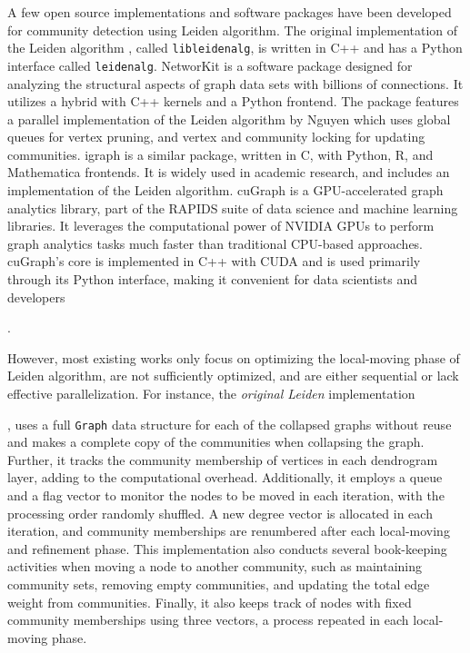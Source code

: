 A few open source implementations and software packages have been developed for community detection using Leiden algorithm. The original implementation of the Leiden algorithm \cite{com-traag19}, called \texttt{libleidenalg}, is written in C++ and has a Python interface called \texttt{leidenalg}. NetworKit \cite{staudt2016networkit} is a software package designed for analyzing the structural aspects of graph data sets with billions of connections. It utilizes a hybrid with C++ kernels and a Python frontend. The package features a parallel implementation of the Leiden algorithm by Nguyen \cite{nguyenleiden} which uses global queues for vertex pruning, and vertex and community locking for updating communities. igraph \cite{csardi2006igraph} is a similar package, written in C, with Python, R, and Mathematica frontends. It is widely used in academic research, and includes an implementation of the Leiden algorithm. cuGraph \cite{kang2023cugraph} is a GPU-accelerated graph analytics library, part of the RAPIDS suite of data science and machine learning libraries. It leverages the computational power of NVIDIA GPUs to perform graph analytics tasks much faster than traditional CPU-based approaches. cuGraph's core is implemented in C++ with CUDA and is used primarily through its Python interface, making it convenient for data scientists and developers.

However, most existing works only focus on optimizing the local-moving phase of Leiden algorithm, are not sufficiently optimized, and are either sequential or lack effective parallelization. For instance, the \textit{original Leiden} implementation \cite{com-traag19}, uses a full \texttt{Graph} data structure for each of the collapsed graphs without reuse and makes a complete copy of the communities when collapsing the graph. Further, it tracks the community membership of vertices in each dendrogram layer, adding to the computational overhead. Additionally, it employs a queue and a flag vector to monitor the nodes to be moved in each iteration, with the processing order randomly shuffled. A new degree vector is allocated in each iteration, and community memberships are renumbered after each local-moving and refinement phase. This implementation also conducts several book-keeping activities when moving a node to another community, such as maintaining community sets, removing empty communities, and updating the total edge weight from communities. Finally, it also  keeps track of nodes with fixed community memberships using three vectors, a process repeated in each local-moving phase.

